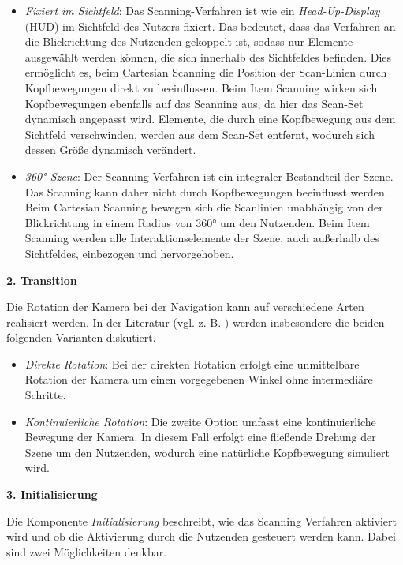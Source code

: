 \begin{itemize}
    \item \textit{Fixiert im Sichtfeld}: Das Scanning-Verfahren ist wie ein \textit{Head-Up-Display} (HUD) im Sichtfeld des Nutzers fixiert. Das bedeutet, dass das Verfahren an die Blickrichtung des Nutzenden gekoppelt ist, sodass nur Elemente ausgewählt werden können, die sich innerhalb des Sichtfeldes befinden. Dies ermöglicht es, beim Cartesian Scanning die Position der Scan-Linien durch Kopfbewegungen direkt zu beeinflussen. Beim Item Scanning wirken sich Kopfbewegungen ebenfalls auf das Scanning aus, da hier das Scan-Set dynamisch angepasst wird. Elemente, die durch eine Kopfbewegung aus dem Sichtfeld verschwinden, werden aus dem Scan-Set entfernt, wodurch sich dessen Größe dynamisch verändert.
    \item \textit{360°-Szene}: Der Scanning-Verfahren ist ein integraler Bestandteil der Szene. Das Scanning kann daher nicht durch Kopfbewegungen beeinflusst werden. Beim Cartesian Scanning bewegen sich die Scanlinien unabhängig von der Blickrichtung in einem Radius von 360° um den Nutzenden. Beim Item Scanning werden alle Interaktionselemente der Szene, auch außerhalb des Sichtfeldes, einbezogen und hervorgehoben. 
\end{itemize}

\textbf{2. Transition}

Die Rotation der Kamera bei der Navigation kann auf verschiedene Arten realisiert werden. In der Literatur (vgl. z. B. \citet{10.1145/3441852.3471230, 10.1007/s10055-020-00425-x, 8797722}) werden insbesondere die beiden folgenden Varianten diskutiert.

\begin{itemize}
    \item \textit{Direkte Rotation}: Bei der direkten Rotation erfolgt eine unmittelbare Rotation der Kamera um einen vorgegebenen Winkel ohne intermediäre Schritte. 
    \item \textit{Kontinuierliche Rotation}: Die zweite Option umfasst eine kontinuierliche Bewegung der Kamera. In diesem Fall erfolgt eine fließende Drehung der Szene um den Nutzenden, wodurch eine natürliche Kopfbewegung simuliert wird. 
\end{itemize}

\textbf{3. Initialisierung} 

Die Komponente \textit{Initialisierung} beschreibt, wie das Scanning Verfahren aktiviert wird und ob die Aktivierung durch die Nutzenden gesteuert werden kann. Dabei sind zwei Möglichkeiten denkbar. 

